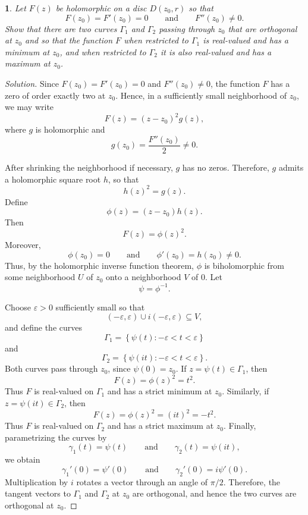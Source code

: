 \documentclass[12pt, a4paper]{report}
\theoremstyle{spaced}
\newtheorem{exercise}{}
\begin{document}
\begin{exercise}
	Let $F(z)$ be holomorphic on a disc $D(z_0,r)$ so that
	\[
		F(z_0)=F'(z_0)=0 \qquad \text{and} \qquad F''(z_0)\neq 0.
	\]
	Show that there are two curves $\Gamma_1$ and $\Gamma_2$ passing through $z_0$
	that are orthogonal at $z_0$ and so that the function $F$ when restricted to
	$\Gamma_1$ is real-valued and has a minimum at $z_0$, and when restricted to
	$\Gamma_2$ it is also real-valued and has a maximum at $z_0$.
\end{exercise}
\begin{proof}[Solution]
	Since \(F(z_0)=F'(z_0)=0\) and \(F''(z_0)\neq 0\), the function \(F\)
	has a zero of order exactly two at \(z_0\). Hence, in a sufficiently
	small neighborhood of \(z_0\), we may write
	\[
		F(z)=(z-z_0)^2g(z),
	\]
	where \(g\) is holomorphic and
	\[
		g(z_0)=\frac{F''(z_0)}{2}\neq 0.
	\]

	After shrinking the neighborhood if necessary, \(g\) has no zeros.
	Therefore, \(g\) admits a holomorphic square root \(h\), so that
	\[
		h(z)^2=g(z).
	\]
	Define
	\[
		\phi(z)=(z-z_0)h(z).
	\]
	Then
	\[
		F(z)=\phi(z)^2.
	\]
	Moreover,
	\[
		\phi(z_0)=0
		\qquad\text{and}\qquad
		\phi'(z_0)=h(z_0)\neq 0.
	\]
	Thus, by the holomorphic inverse function theorem, \(\phi\) is
	biholomorphic from some neighborhood \(U\) of \(z_0\) onto a
	neighborhood \(V\) of \(0\). Let
	\[
		\psi=\phi^{-1}.
	\]

	Choose \(\varepsilon>0\) sufficiently small so that
	\[
		(-\varepsilon,\varepsilon)\cup
		i(-\varepsilon,\varepsilon)\subseteq V,
	\]
	and define the curves
	\[
		\Gamma_1=\left\{\psi(t): -\varepsilon<t<\varepsilon\right\}
	\]
	and
	\[
		\Gamma_2=\left\{\psi(it): -\varepsilon<t<\varepsilon\right\}.
	\]
	Both curves pass through \(z_0\), since \(\psi(0)=z_0\).
	If \(z=\psi(t)\in\Gamma_1\), then
	\[
		F(z)=\phi(z)^2=t^2.
	\]
	Thus \(F\) is real-valued on \(\Gamma_1\) and has a strict minimum at
	\(z_0\).
	Similarly, if \(z=\psi(it)\in\Gamma_2\), then
	\[
		F(z)=\phi(z)^2=(it)^2=-t^2.
	\]
	Thus \(F\) is real-valued on \(\Gamma_2\) and has a strict maximum at
	\(z_0\).
	Finally, parametrizing the curves by
	\[
		\gamma_1(t)=\psi(t)
		\qquad\text{and}\qquad
		\gamma_2(t)=\psi(it),
	\]
	we obtain
	\[
		\gamma_1'(0)=\psi'(0)
		\qquad\text{and}\qquad
		\gamma_2'(0)=i\psi'(0).
	\]
	Multiplication by \(i\) rotates a vector through an angle of
	\(\pi/2\). Therefore, the tangent vectors to \(\Gamma_1\) and
	\(\Gamma_2\) at \(z_0\) are orthogonal, and hence the two curves are
	orthogonal at \(z_0\).
\end{proof}
\end{document}
